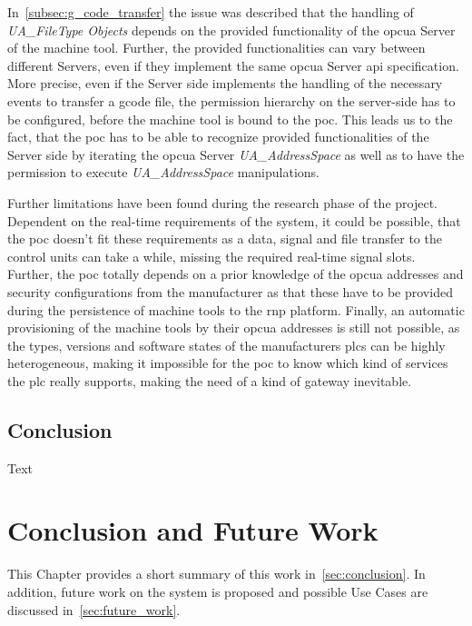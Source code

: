 \documentclass[
a4paper,
twoside,
headsepline,
cleardoublepage=empty,
parskip=half,
draft=false
]{scrbook}
\begin{document}
			In~\cref{subsec:g_code_transfer} the issue was described that the handling of \textit{UA\_FileType Objects} depends on the provided functionality of the \gls{opcua} Server of the machine tool. 
			Further, the provided functionalities can vary between different Servers, even if they implement the same \gls{opcua} Server \gls{api} specification. More precise, even if the Server side implements the handling of the necessary events to transfer a \gls{gcode} file, the permission hierarchy on the server-side has to be configured, before the machine tool is bound to the \gls{poc}. This leads us to the fact, that the \gls{poc} has to be able to recognize provided functionalities of the Server side by iterating the \gls{opcua} Server \textit{UA\_AddressSpace} as well as to have the permission to execute \textit{UA\_AddressSpace} manipulations.

			Further limitations have been found during the research phase of the project. Dependent on the real-time requirements of the system, it could be possible, that the \gls{poc} doesn't fit these requirements as a data, signal and file transfer to the control units can take a while, missing the required real-time signal slots. 
			Further, the \gls{poc} totally depends on a prior knowledge of the \gls{opcua} addresses and security configurations from the manufacturer as that these have to be provided during the persistence of machine tools to the \gls{rnp} platform. 
			Finally, an automatic provisioning of the machine tools by their \gls{opcua} addresses is still not possible, as the types, versions and software states of the manufacturers \gls{plc}s can be highly heterogeneous, making it impossible for the \gls{poc} to know which kind of services the \gls{plc} really supports, making the need of a kind of gateway inevitable.
			
		\section*{Conclusion}\label{sec:discussion_conclusion}
		
			Text

	\chapter{Conclusion and Future Work} \label{ch:conclusion_and_future_work}

		This Chapter provides a short summary of this work in~\cref{sec:conclusion}. In addition, future work on the system is proposed and possible Use Cases are discussed in~\cref{sec:future_work}.
\end{document}

